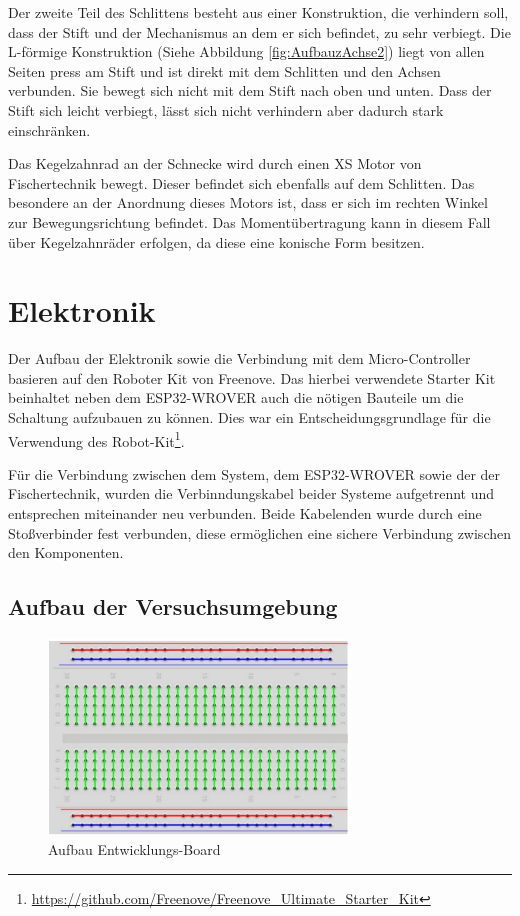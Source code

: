 \documentclass[conference,compsoc,final,a4paper]{IEEEtran}
\begin{document}
Der zweite Teil des Schlittens besteht aus einer Konstruktion, die verhindern soll, dass der Stift und der Mechanismus an dem er sich befindet, zu sehr verbiegt. Die L-förmige
Konstruktion (Siehe Abbildung \ref{fig:AufbauzAchse2}) liegt von allen Seiten press am Stift und ist direkt mit dem Schlitten und den Achsen verbunden. Sie bewegt sich nicht mit
dem Stift nach oben und unten. Dass der Stift sich leicht verbiegt, lässt sich nicht verhindern aber dadurch stark einschränken.

Das Kegelzahnrad an der Schnecke wird durch einen XS Motor von Fischertechnik bewegt. Dieser befindet sich ebenfalls auf dem Schlitten. Das besondere an der Anordnung dieses Motors ist, dass er sich im rechten Winkel zur Bewegungsrichtung befindet. Das Momentübertragung kann in diesem Fall über Kegelzahnräder erfolgen, da diese eine konische Form besitzen.


\section{Elektronik}
Der Aufbau der Elektronik sowie die Verbindung mit dem Micro-Controller basieren auf den Roboter Kit von Freenove. 
Das hierbei verwendete Starter Kit beinhaltet neben dem ESP32-WROVER auch die nötigen Bauteile um die Schaltung aufzubauen zu können. 
Dies war ein Entscheidungsgrundlage für die Verwendung des Robot-Kit\footnote{\url{https://github.com/Freenove/Freenove\_Ultimate\_Starter\_Kit}}.

Für die Verbindung zwischen dem System, dem ESP32-WROVER sowie der der Fischertechnik, wurden die Verbinndungskabel beider Systeme aufgetrennt und entsprechen miteinander neu verbunden.
Beide Kabelenden wurde durch eine Stoßverbinder fest verbunden, diese ermöglichen eine sichere Verbindung zwischen den Komponenten.

\subsection{Aufbau der Versuchsumgebung}
\begin{figure}[h]
\centering
\includegraphics[width=8cm]{../images/board.png}
\caption{Aufbau Entwicklungs-Board \autocite{freenoveTutorial}}\label{Elektrik:DevBoard}
\end{figure}
\end{document}
